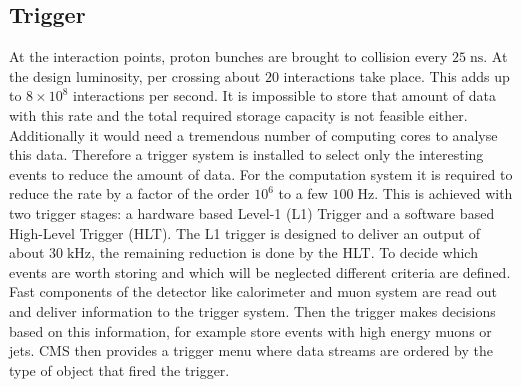 \subsection{Trigger}
\label{sec:trigger}
	At the interaction points, proton bunches are brought to collision every $25\;\text{ns}$. At the design luminosity, per crossing about $20$ interactions take place. This adds up to $8 \times 10^8$ interactions per second.	It is impossible to store that amount of data with this rate and the total required storage capacity is not feasible either. Additionally it would need a tremendous number of computing cores to analyse this data. Therefore a trigger system is installed to select only the interesting events to reduce the amount of data. For the computation system it is required to reduce the rate by a factor of the order $10^6$ to a few $100\;\text{Hz}$. This is achieved with two trigger stages: a hardware based Level-1 (L1) Trigger\cite{L1} and a software based High-Level Trigger (HLT)\cite{HLT}. The L1 trigger is designed to deliver an output of about $30\;\text{kHz}$, the remaining reduction is done by the HLT.	To decide which events are worth storing and which will be neglected different criteria are defined. Fast components of the detector like calorimeter and muon system are read out and deliver information to the trigger system. Then the trigger makes decisions based on this information, for example store events with high energy muons or jets. CMS then provides a trigger menu where data streams are ordered by the type of object that fired the trigger.

	